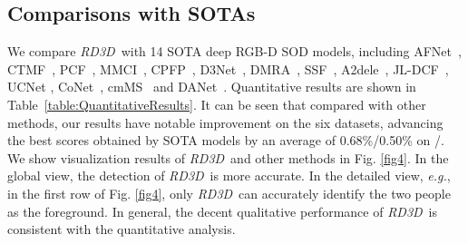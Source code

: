 \documentclass[letterpaper]{article}
\def\ourmodel{\emph{RD3D}}
\begin{document}
\subsection{Comparisons with SOTAs}
We compare \ourmodel~with 14 SOTA deep RGB-D SOD models, including AFNet~\cite{wang2019adaptive}, CTMF~\cite{han2017cnns}, PCF~\cite{chen2018progressively}, MMCI~\cite{chen2019multi}, CPFP~\cite{zhao2019contrast}, D3Net~\cite{fan2020rethinking}, DMRA~\cite{piao2019depth}, SSF~\cite{zhang2020select}, A2dele~\cite{piao2020a2dele}, JL-DCF~\cite{fu2020jl}, UCNet \cite{zhang2020uc,zhang2020uncertainty}, CoNet~\cite{ji2020accurate}, cmMS~\cite{li2020rgb} and DANet~\cite{zhao2020single}. Quantitative results are shown in Table~\ref{table:QuantitativeResults}. It can be seen that compared with other methods, our results have notable improvement on the six datasets, advancing the best scores obtained by SOTA models by an average of 0.68\%/0.50\% on /. We show visualization results of \ourmodel~and other methods in Fig. \ref{fig4}. In the global view, the detection of \ourmodel~is more accurate. In the detailed view, \emph{e.g.}, in the first row of Fig. \ref{fig4}, only \ourmodel~can accurately identify the two people as the foreground. In general, the decent qualitative performance of \ourmodel~is consistent with the quantitative analysis.
\end{document}
